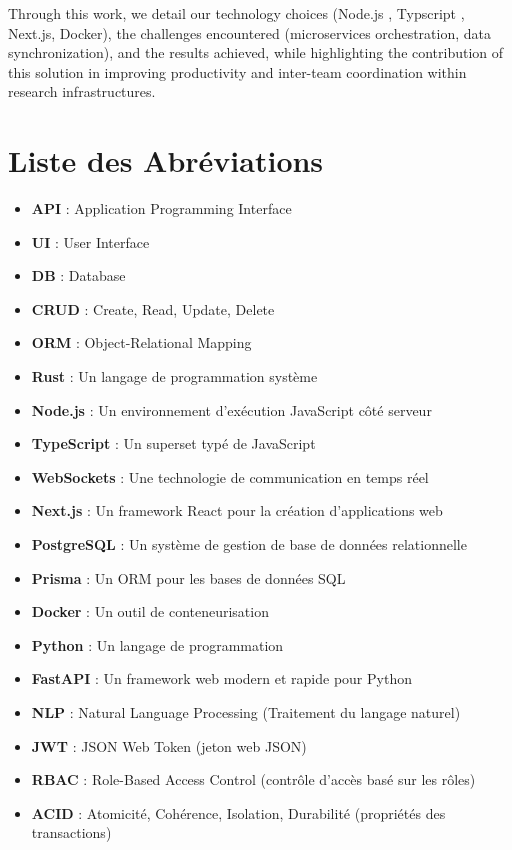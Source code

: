 \documentclass[12pt]{rapportPfe}
\begin{document}
Through this work, we detail our technology choices (Node.js , Typscript , Next.js, Docker), the challenges encountered (microservices orchestration, data synchronization), and the results achieved, while highlighting the contribution of this solution in improving productivity and inter-team coordination within research infrastructures.

\chapter*{Liste des Abréviations}
	\begin{itemize}
	  \item \textbf{API} : Application Programming Interface
	  \item \textbf{UI} : User Interface
	  \item \textbf{DB} : Database
	  \item \textbf{CRUD} : Create, Read, Update, Delete
	  \item \textbf{ORM} : Object-Relational Mapping
	  \item \textbf{Rust} : Un langage de programmation système
	  \item \textbf{Node.js} : Un environnement d'exécution JavaScript côté serveur
	  \item \textbf{TypeScript} : Un superset typé de JavaScript
	  \item \textbf{WebSockets} : Une technologie de communication en temps réel
	  \item \textbf{Next.js} : Un framework React pour la création d'applications web
	  \item \textbf{PostgreSQL} : Un système de gestion de base de données relationnelle
	  \item \textbf{Prisma} : Un ORM pour les bases de données SQL
	  \item \textbf{Docker} : Un outil de conteneurisation
	  \item \textbf{Python} : Un langage de programmation
	  \item \textbf{FastAPI} : Un framework web modern et rapide pour Python
	  \item \textbf{NLP} : Natural Language Processing (Traitement du langage naturel)
	  \item \textbf{JWT} : JSON Web Token (jeton web JSON)
	  \item \textbf{RBAC} : Role-Based Access Control (contrôle d'accès basé sur les rôles)
	  \item \textbf{ACID} : Atomicité, Cohérence, Isolation, Durabilité (propriétés des transactions)

\end{itemize}
\end{document}
